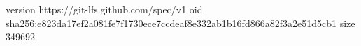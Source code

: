 version https://git-lfs.github.com/spec/v1
oid sha256:e823da17ef2a081fe7f1730ece7ccdeaf8e332ab1b16fd866a82f3a2e51d5cb1
size 349692

